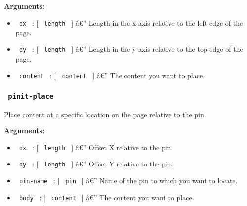 \begin{Shaded}
\begin{Highlighting}[]
\end{Highlighting}
\end{Shaded}

\textbf{Arguments:}

\begin{itemize}
\tightlist
\item
  \texttt{\ dx\ } : {[} \texttt{\ length\ } {]} â€'' Length in the
  x-axis relative to the left edge of the page.
\item
  \texttt{\ dy\ } : {[} \texttt{\ length\ } {]} â€'' Length in the
  y-axis relative to the top edge of the page.
\item
  \texttt{\ content\ } : {[} \texttt{\ content\ } {]} â€'' The content
  you want to place.
\end{itemize}

\subsubsection{\texorpdfstring{\texttt{\ pinit-place\ }}{ pinit-place }}\label{pinit-place}

Place content at a specific location on the page relative to the pin.

\begin{Shaded}
\begin{Highlighting}[]
\end{Highlighting}
\end{Shaded}

\textbf{Arguments:}

\begin{itemize}
\tightlist
\item
  \texttt{\ dx\ } : {[} \texttt{\ length\ } {]} â€'' Offset X relative
  to the pin.
\item
  \texttt{\ dy\ } : {[} \texttt{\ length\ } {]} â€'' Offset Y relative
  to the pin.
\item
  \texttt{\ pin-name\ } : {[} \texttt{\ pin\ } {]} â€'' Name of the pin
  to which you want to locate.
\item
  \texttt{\ body\ } : {[} \texttt{\ content\ } {]} â€'' The content you
  want to place.
\end{itemize}

